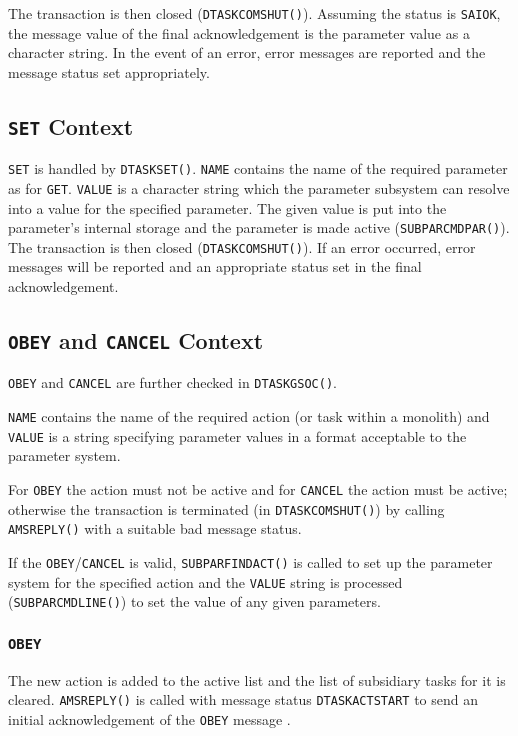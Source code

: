 \documentclass[twoside,11pt]{article}
\newcommand{\htmlref}[2]{#1}
\renewcommand{\_}{\texttt{\symbol{95}}}
\begin{document}
The transaction is then closed (\texttt{DTASK\_COMSHUT()}). Assuming the
status is \texttt{SAI\_\_OK}, the message value of the final acknowledgement is
the parameter value as a character string.  In the event of an error, error
messages are reported and the message status set appropriately.

\subsection{\label{set_context}\texttt{SET} Context}
\texttt{SET} is handled by \texttt{DTASK\_SET()}.
\texttt{NAME} contains the name of the required parameter as for
\htmlref{\texttt{GET}}{get_context}.
\texttt{VALUE} is a character string which the parameter subsystem can resolve
into a value for the specified parameter.
The given value is put into the parameter's internal storage and the parameter
is made active (\texttt{SUBPAR\_CMDPAR()}).
The transaction is then closed (\texttt{DTASK\_COMSHUT()}). If an error
occurred, error messages will be reported and an appropriate status set in
the final acknowledgement.

\subsection{\label{obey_and_cancel_context}
\texttt{OBEY} and \texttt{CANCEL} Context}
\texttt{OBEY} and \texttt{CANCEL} are further checked in
\texttt{DTASK\_GSOC()}.

\texttt{NAME} contains the name of the required action (or task within a
monolith) and \texttt{VALUE} is a string specifying parameter
values in a format acceptable to the parameter system.

For \texttt{OBEY} the action must not be active and for \texttt{CANCEL} the
action must be active; otherwise the transaction is terminated (in
\texttt{DTASK\_COMSHUT()}) by calling \texttt{AMS\_REPLY()} with a suitable
bad message status.

If the \texttt{OBEY}/\texttt{CANCEL} is valid, \texttt{SUBPAR\_FINDACT()}
is called to set up the parameter system for the specified action and the
\texttt{VALUE} string is processed (\texttt{SUBPAR\_CMDLINE()}) to set the
value of any given parameters.

\subsubsection{\texttt{OBEY}}
The new action is added to the active list and the list of
subsidiary tasks for it is cleared. \texttt{AMS\_REPLY()} is called with
message status \texttt{DTASK\_\_ACTSTART} to send an initial acknowledgement
of the \texttt{OBEY} message .
\end{document}
